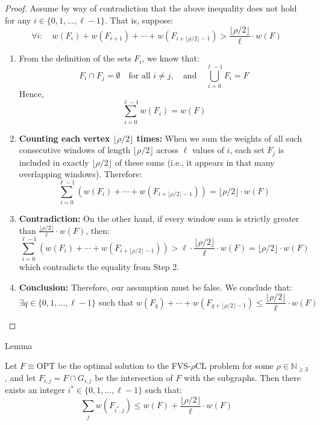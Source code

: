 \begin{proof}
    Assume by way of contradiction that the above inequality does not hold for any \( i \in \{0, 1, \ldots, \ell - 1\} \).  
    That is, suppose:
    \[
    \forall i: \quad w(F_i) + w(F_{i+1}) + \cdots + w(F_{i + \lfloor \rho/2 \rfloor - 1}) > \frac{\lfloor \rho/2 \rfloor}{\ell} \cdot w(F)
    \]
    
    \begin{enumerate}
        \item From the definition of the sets \( F_i \), we know that:
        \[
        F_i \cap F_j = \emptyset \quad \text{for all } i \neq j, \quad \text{and} \quad \bigcup_{i=0}^{\ell - 1} F_i = F
        \]
        Hence,
        \[
        \sum_{i=0}^{\ell - 1} w(F_i) = w(F)
        \]

        \item \textbf{Counting each vertex \(\lfloor \rho/2 \rfloor\) times:}  
        When we sum the weights of all such consecutive windows of length \( \lfloor \rho/2 \rfloor \) across \( \ell \) values of \( i \),  
        each set \( F_j \) is included in exactly \( \lfloor \rho/2 \rfloor \) of these sums (i.e., it appears in that many overlapping windows).
        Therefore:
        \[
        \sum_{i=0}^{\ell - 1} \left( w(F_i) + \cdots + w(F_{i + \lfloor \rho/2 \rfloor - 1}) \right) = \lfloor \rho/2 \rfloor \cdot w(F)
        \]

        \item \textbf{Contradiction:}  
        On the other hand, if every window sum is strictly greater than \( \frac{\lfloor \rho/2 \rfloor}{\ell} \cdot w(F) \), then:
        \[
        \sum_{i=0}^{\ell - 1} \left( w(F_i) + \cdots + w(F_{i + \lfloor \rho/2 \rfloor - 1}) \right)
        > \ell \cdot \frac{\lfloor \rho/2 \rfloor}{\ell} \cdot w(F)
        = \lfloor \rho/2 \rfloor \cdot w(F)
        \]
        which contradicts the equality from Step 2.

        \item \textbf{Conclusion:}  
        Therefore, our assumption must be false. We conclude that:
        \[
        \exists q \in \{0, 1, \ldots, \ell - 1\} \text{ such that }
        w(F_q) + \cdots + w(F_{q + \lfloor \rho/2 \rfloor - 1}) \leq \frac{\lfloor \rho/2 \rfloor}{\ell} \cdot w(F)
        \]
    \end{enumerate}
\end{proof}


\begin{mydefinition}{Lemma}
    \label{lemma-rho-weighted-bound}

    Let \( F \equiv \text{OPT} \) be the optimal solution to the FVS-\(\rho\)CL problem for some \(\rho \in \mathbb{N}_{\geq 3}\),
    and let \( F_{i, j} = F \cap G_{i, j} \) be the intersection of \( F \) with the subgraphs. Then there exists an
    integer \( i^* \in \{0, 1, \dots, \ell - 1\} \) such that:
    \[
        \sum\limits_{j} w(F_{i^*, j}) \leq w(F) + \frac{\lfloor \rho/2 \rfloor}{\ell} \cdot w(F)
    \]
\end{mydefinition}

